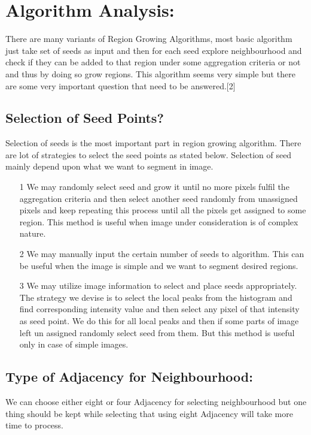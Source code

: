 \documentclass{article}
\begin{document}
\section{Algorithm Analysis:}
There are many variants of Region Growing Algorithms, most basic algorithm just take set of seeds as input and then for each seed explore neighbourhood and check if they can be added to that region under some aggregation criteria or not and thus by doing so grow regions. This algorithm seems very simple but there are some very important question that need to be answered.[2]
\subsection{Selection of Seed Points?}
Selection of seeds is the most important part in region growing algorithm. There are lot of strategies to select the seed points as stated below. Selection of seed mainly depend upon what we want to segment in image.
\begin{itemize}
  \item[1] We may randomly select seed and grow it until no more pixels fulfil the aggregation criteria and then select another seed randomly from unassigned pixels and keep repeating this process until all the pixels get assigned to some region. This method is useful when image under consideration is of complex nature.
  \item[2] We may manually input the certain number of seeds to algorithm. This can be useful when the image is simple and we want to segment desired regions.
  \item[3] We may utilize image information to select and place seeds appropriately. The strategy we devise is to select the local peaks from the histogram and find corresponding intensity value and then select any pixel of that intensity as seed point. We do this for all local peaks and then if some parts of image left un assigned randomly select seed from them. But this method is useful only in case of simple images.

\end{itemize}
\subsection{Type of Adjacency for Neighbourhood:}
We can choose either eight or four Adjacency for selecting neighbourhood but one thing should be kept while selecting that using eight Adjacency will take more time to process.
\end{document}
